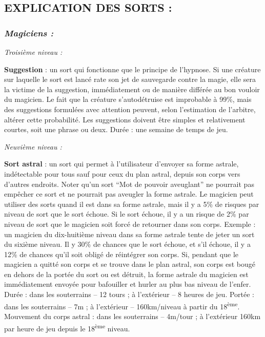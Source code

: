 \subsection*{EXPLICATION DES SORTS :}

\subsubsection*{\textit{Magiciens :}}

\textit{Troisième niveau :}

\bigskip

\label{sort-suggestion}\textbf{Suggestion} : un sort qui fonctionne que le principe de l'hypnose. Si une créature sur laquelle le sort est lancé rate son jet de sauvegarde contre la magie, elle sera la victime de la suggestion, immédiatement ou de manière différée au bon vouloir du magicien. Le fait que la créature s'autodétruise est improbable à 99\%, mais des suggestions formulées avec attention peuvent, selon l'estimation de l'arbitre, altérer cette probabilité. Les suggestions doivent être simples et relativement courtes, soit une phrase ou deux. Durée : une semaine de temps de jeu.

\bigskip

\textit{Neuvième niveau :}

\bigskip

\label{sort-astral}\textbf{Sort astral} : un sort qui permet à l'utilisateur d'envoyer sa forme astrale, indétectable pour tous sauf pour ceux du plan astral, depuis son corps vers d'autres endroits. Noter qu'un sort ``Mot de pouvoir aveuglant'' ne pourrait pas empêcher ce sort et ne pourrait pas aveugler la forme astrale. Le magicien peut utiliser des sorts quand il est dans sa forme astrale, mais il y a 5\% de risques par niveau de sort que le sort échoue. Si le sort échoue, il y a un risque de 2\% par niveau de sort que le magicien soit forcé de retourner dans son corps. Exemple : un magicien du dix-huitième niveau dans sa forme astrale tente de jeter un sort du sixième niveau. Il y  30\% de chances que le sort échoue, et s'il échoue, il y a 12\% de chances qu'il soit obligé de réintégrer son corps. Si, pendant que le magicien a quitté son corps et se trouve dans le plan astral, son corps est bougé en dehors de la portée du sort ou est détruit, la forme astrale du magicien est immédiatement envoyée pour bafouiller et hurler au plus bas niveau de l'enfer. Durée : dans les souterrains -- 12 tours ; à l'extérieur -- 8 heures de jeu. Portée : dans les souterrains -- 7m ; à l'extérieur -- 160km/niveau à partir du 18\textsuperscript{ème}. Mouvement du corps astral : dans les souterrains -- 4m/tour ; à l'extérieur 160km par heure de jeu depuis le 18\textsuperscript{ème} niveau.



